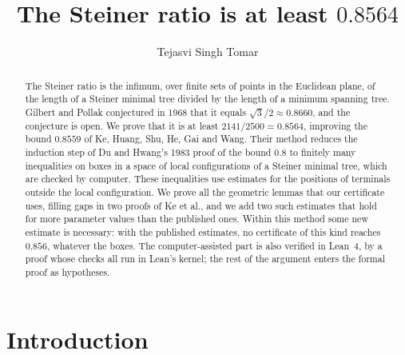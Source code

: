 \documentclass[11pt]{amsart}
\theoremstyle{definition}
\theoremstyle{remark}
\numberwithin{equation}{section}
\newcommand{\ttitle}{The Steiner ratio is at least $0.8564$}
\newcommand{\rtitle}{The Steiner ratio is at least $0.8564$}
\newcommand{\CAPSTAR}{0.856}
\begin{document}
\title[\rtitle]{\ttitle}
\author{Tejasvi Singh Tomar}
\renewcommand{\urladdrname}{{\itshape ORCID}}

\begin{abstract}
The Steiner ratio is the infimum, over finite sets of points in the Euclidean plane, of the length of a Steiner minimal tree divided by the length of a minimum spanning tree. Gilbert and Pollak conjectured in 1968 that it equals $\sqrt3/2\approx0.8660$, and the conjecture is open. We prove that it is at least $2141/2500=0.8564$, improving the bound $0.8559$ of Ke, Huang, Shu, He, Gai and Wang. Their method reduces the induction step of Du and Hwang's 1983 proof of the bound $0.8$ to finitely many inequalities on boxes in a space of local configurations of a Steiner minimal tree, which are checked by computer. These inequalities use estimates for the positions of terminals outside the local configuration. We prove all the geometric lemmas that our certificate uses, filling gaps in two proofs of Ke et al., and we add two such estimates that hold for more parameter values than the published ones. Within this method some new estimate is necessary: with the published estimates, no certificate of this kind reaches $\CAPSTAR$, whatever the boxes. The computer-assisted part is also verified in Lean~4, by a proof whose checks all run in Lean's kernel; the rest of the argument enters the formal proof as hypotheses.
\end{abstract}

\maketitle

\section{Introduction}\label{sec:intro}
\end{document}
